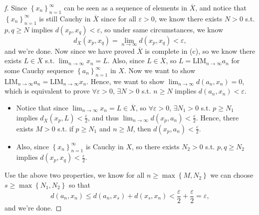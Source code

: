 \begin{proof}[f]
  Since \(\left\{ x_n \right\}_{n=1}^{\infty}  \) can be seen as a sequence of elements in \(\overline{X} \), and notice that \(\left\{ x_n \right\}_{n=1}^{\infty}  \) is still Cauchy in \(\overline{X} \) since for all \(\varepsilon > 0\), we know there exists \(N > 0\) s.t. \(p, q \ge N\) implies \(d(x_p, x_q) < \varepsilon  \), so under same circumstances, we know 
  \[
    d_{\overline{X} }(x_p, x_q) = \lim_{n \to \infty} d(x_p, x_q) < \varepsilon , 
  \] and we're done. Now since we have proved \(\overline{X} \) is complete in (c), so we know there exists \(L \in \overline{X} \) s.t. \(\lim_{n \to \infty} x_n = L \). Also, since \(L \in \overline{X} \), so \(L = \mathrm{LIM}_{n \to \infty }a_n \) for some Cauchy sequence \(\left\{ a_n \right\}_{n=1}^{\infty}  \) in \(X\). Now we want to show \(\mathrm{LIM}_{n \to \infty } a_n = \mathrm{LIM}_{n \to \infty } x_n  \). Hence, we want to show \(\lim_{n \to \infty} d(a_n, x_n) = 0 \), which is equivalent to prove \(\forall \varepsilon > 0\), \(\exists N > 0\) s.t. \(n \ge N\) implies \(d(a_n, x_n) < \varepsilon \). 
  \begin{itemize}
    \item Notice that since \(\lim_{n \to \infty} x_n = L \in \overline{X} \), so \(\forall \varepsilon >0\), \(\exists N_1 > 0\) s.t. \(p \ge N_1\) implies \(d_{\overline{X} }(x_p, L) < \frac{\varepsilon}{2}\), and thus \(\lim_{n \to \infty} d(x_p, a_n) < \frac{\varepsilon}{2} \). Hence, there exists \(M > 0\) s.t. if \(p \ge N_1\) and \(n \ge M\), then \(d(x_p, a_n) < \frac{\varepsilon}{2}\). 
    \item Also, since \(\left\{ x_n \right\}_{n=1}^{\infty}  \) is Cauchy in \(X\), so there exists \(N_2 > 0\) s.t. \(p, q \ge N_2\) implies \(d(x_p, x_q) < \frac{\varepsilon}{2}\).             
  \end{itemize}            
  Use the above two properties, we know for all \(n \ge \max \left\{ M, N_2 \right\} \) we can choose \(s \ge \max \left\{ N_1, N_2 \right\} \) so that 
  \[
    d(a_n, x_n) \le d(a_n, x_s) + d(x_s, x_n) < \frac{\varepsilon}{2} + \frac{\varepsilon}{2} = \varepsilon,
  \] and we're done.
\end{proof}

